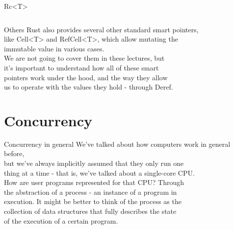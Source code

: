 \documentclass[usenames,dvipsnames,10pt,aspectratio=169]{beamer}
\begin{document}
\begin{frame}{Rc<T>}
	\inputminted[fontsize=\normalsize]{rust}{code/rc1.rs}
	\vspace{0.4cm}
\end{frame}

\begin{frame}{Others}
	\large
	Rust also provides several other standard smart pointers,\\
	like \textcolor{ucuyellow}{Cell<T>} and \textcolor{ucuyellow}{RefCell<T>}, which
	allow mutating the\\
	immutable value in various cases.\\
	\vspace{0.4cm}
	We are not going to cover them in these lectures, but\\
	it's important to understand how all of these smart\\
	pointers work under the hood, and the way they allow\\
	us to operate with the values they hold - through \textcolor{ucuyellow}{Deref}.
\end{frame}


\section{Concurrency}

\begin{frame}{Concurrency in general}
	\large
	We've talked about how computers work in general before,\\
	but we've always implicitly assumed that they only run one\\
	thing at a time - that is, we've talked about a single-core CPU.\\
	\vspace{0.3cm}
	How are user programs represented for that CPU? Through\\
	the abstraction of a process - an instance of a program in\\
	execution. It might be better to think of the process as the\\
	collection of data structures that fully describes the state\\
	of the execution of a certain program.\\
\end{frame}
\end{document}
